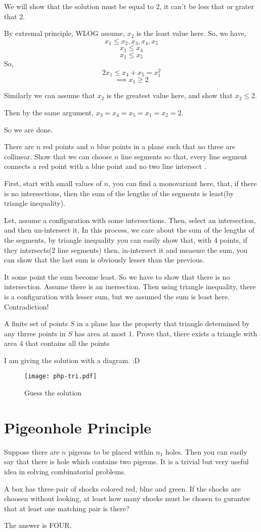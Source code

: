 We will show that the solution must be equal to $2$, it can't be less that or grater that $2$.

By extremal principle, WLOG assume, $x_2$ is the least value here. So, we have,
\[ x_1 \le x_2, x_3, x_4, x_5\]
\[ x_1 \le x_4\]
\[ x_1 \le x_5\]
So, \[ 2x_1 \le x_4 +x_5 = x_1 ^2 \]
\[\implies x_1 \ge 2 \]

Similarly we can assume that $x_2$ is the greatest value here, and show that $x_2 \le 2$.

Then by the same argument, $x_3=x_4=x_5=x_1=x_2=2$.

So we are done.

\begin{example}
There are $n$ red points and $n$ blue points in a plane such that no three are collinear. Show that we can choose $n$  line segments so that, every line segment connects a red point with a blue point and no two line intersect . 
\end{example}
First, start with small values of $n$, you can find a monovariant here, that, if there is no intersections, then the sum of the lengths of the segments is least(by triangle inequality).

Let, assume a configuration with some intersections. Then, select an intersection, and then un-intersect it. In this process, we care about the sum of the lengths of the segments, by triangle inequality you can easily show that, with 4 points, if they intersects(2 line segments) then, in-intersect it and measure the sum, you can show that the last sum is obviously lesser than the previous.

It some point the sum become least. So we have to show that there is no intersection. Assume there is an inersection. Then using triangle inequality, there is a configuration with lesser sum, but we assumed the sum is least here. Contradiction!


\begin{example}
A finite set of points $S$ in a plane has the property that triangle determined by any thrree points in $S$ has area at most $1.$ Prove that, there exists a triangle with area $4$ that contains all the points
\end{example}
I am giving the solution with a diagram. :D 
\begin{figure}[h!]
\centering
	\texttt{[image: php-tri.pdf]}
	\caption{Guess the solution}
\end{figure}


\section{Pigeonhole Principle}
Suppose there are $n$ pigeons to be placed within $n_1$ holes. Then you can easily say that there is hole which contains two pigeons. It is a trivial but very useful idea in solving combinatorial problems.
\begin{example}
A box has three pair of shocks colored red, blue and green. If the shocks are choosen without looking, at least how many shocks must be chosen to gurantee that at least one matching pair is there?
\end{example}
The answer is FOUR.


